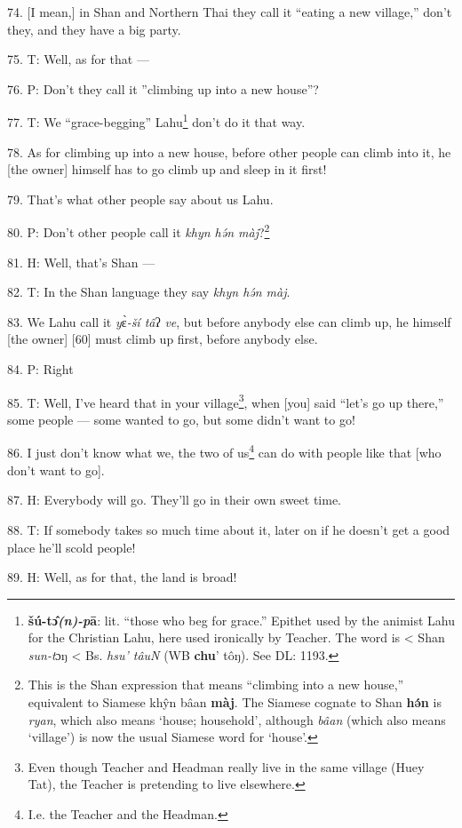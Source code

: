 74. [I mean,] in Shan and Northern Thai they call it ``eating a new village,''
don't they, and they have a big party.

75. T: Well, as for that ---

76. P: Don't they call it ''climbing up into a new house''?

77. T: We ``grace-begging'' Lahu\footnote{\textbf{šú-tɔ̂\textit{(n)-p}ā}: lit. ``those who beg for grace.'' Epithet used by the animist Lahu for the Christian Lahu, here used ironically by Teacher. The word is < Shan \textit{sun-t}ɔŋ < Bs. \textit{hsu' tâuN} (WB \textbf{chu}' tôŋ). See DL: 1193.} don't do it that way.

78. As for climbing up into a new house, before other people can climb into it,
he [the owner] himself has to go climb up and sleep in it first!

79. That's what other people say about us Lahu.

80. P: Don't other people call it \textit{khyn hə́n màj}?\footnote{This is the Shan expression that means ``climbing into a new house,'' equivalent to Siamese khŷn bâan \textbf{màj}. The Siamese cognate to Shan \textbf{hə́n} is \textit{ryan}, which also means `house; household', although \textit{bâan} (which also means `village') is now the usual Siamese word for `house'.}

81. H: Well, that's Shan ---

82. T: In the Shan language they say \textit{khyn hə́n màj}.

83. We Lahu call it \textit{y}ɛ̀\textit{-ší tâ}ʔ\textit{ ve}, but before
anybody else can climb up, he himself [the owner] [60] must climb up first, before
anybody else.

84. P: Right

85. T: Well, I've heard that in your village\footnote{Even though Teacher and Headman really live in the same village (Huey Tat), the Teacher is pretending to live elsewhere.}, when [you] said ``let's go up
there,'' some people --- some wanted to go, but some didn't want to go!

86. I just don't know what we, the two of us\footnote{I.e. the Teacher and the Headman.} can do with people like that
[who don't want to go].

87. H: Everybody will go. They'll go in their own sweet time.

88. T: If somebody takes so much time about it, later on if he doesn't get a good
place he'll scold people!

89. H: Well, as for that, the land is broad!

